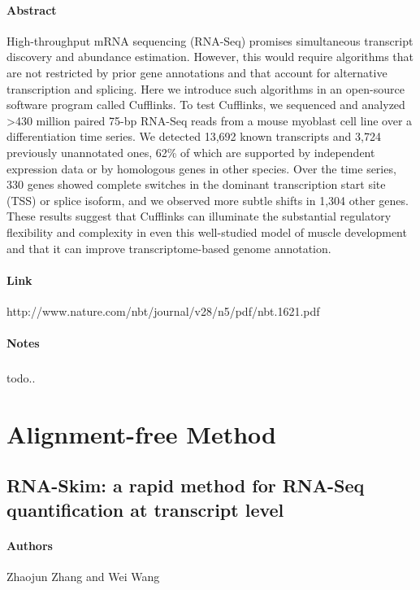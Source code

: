 \documentclass{article}
\begin{document}
		\paragraph{Abstract\\} High-throughput mRNA sequencing (RNA-Seq) promises simultaneous transcript discovery and abundance estimation. However, this would require algorithms that are not restricted by prior gene annotations and that account for alternative transcription and splicing. Here we introduce such algorithms in an open-source software program called Cufflinks. To test Cufflinks, we sequenced and analyzed >430 million paired 75-bp RNA-Seq reads from a mouse myoblast cell line over a differentiation time series. We detected 13,692 known transcripts and 3,724 previously unannotated ones, 62\% of which are supported by independent expression data or by homologous genes in other species. Over the time series, 330 genes showed complete switches in the dominant transcription start site (TSS) or splice isoform, and we observed more subtle shifts in 1,304 other genes. These results suggest that Cufflinks can illuminate the substantial regulatory flexibility and complexity in even this well-studied model of muscle development and that it can improve transcriptome-based genome annotation.
		\paragraph{Link\\} http://www.nature.com/nbt/journal/v28/n5/pdf/nbt.1621.pdf
		\paragraph{Notes}
		\subparagraph{} todo..
	\section{Alignment-free Method}
		\subsection{RNA-Skim: a rapid method for RNA-Seq quantification at transcript level}
		\paragraph{Authors\\} Zhaojun Zhang and Wei Wang
\end{document}

